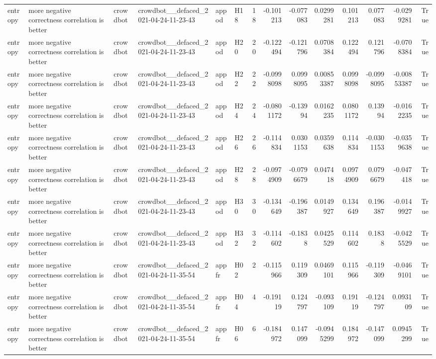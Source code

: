 \begin{longtable}{llllllrrrrrrrr}
entropy & more negative correctness correlation is better & crowdbot & crowdbot\_\_defaced\_2021-04-24-11-23-43 & appod & H18 & 18 & -0.101213 & -0.077083 & 0.0299281 & 0.101213 & 0.077083 & -0.0299281 & True \\
entropy & more negative correctness correlation is better & crowdbot & crowdbot\_\_defaced\_2021-04-24-11-23-43 & appod & H20 & 20 & -0.122494 & -0.121796 & 0.0708384 & 0.122494 & 0.121796 & -0.0708384 & True \\
entropy & more negative correctness correlation is better & crowdbot & crowdbot\_\_defaced\_2021-04-24-11-23-43 & appod & H22 & 22 & -0.0998098 & 0.0998095 & 0.00853387 & 0.0998098 & -0.0998095 & -0.00853387 & True \\
entropy & more negative correctness correlation is better & crowdbot & crowdbot\_\_defaced\_2021-04-24-11-23-43 & appod & H24 & 24 & -0.0801172 & -0.13994 & 0.0162235 & 0.0801172 & 0.13994 & -0.0162235 & True \\
entropy & more negative correctness correlation is better & crowdbot & crowdbot\_\_defaced\_2021-04-24-11-23-43 & appod & H26 & 26 & -0.114834 & 0.0301153 & 0.0359638 & 0.114834 & -0.0301153 & -0.0359638 & True \\
entropy & more negative correctness correlation is better & crowdbot & crowdbot\_\_defaced\_2021-04-24-11-23-43 & appod & H28 & 28 & -0.0974909 & -0.0796679 & 0.047418 & 0.0974909 & 0.0796679 & -0.047418 & True \\
entropy & more negative correctness correlation is better & crowdbot & crowdbot\_\_defaced\_2021-04-24-11-23-43 & appod & H30 & 30 & -0.134649 & -0.196387 & 0.0149927 & 0.134649 & 0.196387 & -0.0149927 & True \\
entropy & more negative correctness correlation is better & crowdbot & crowdbot\_\_defaced\_2021-04-24-11-23-43 & appod & H32 & 32 & -0.114602 & -0.1838 & 0.0425529 & 0.114602 & 0.1838 & -0.0425529 & True \\
entropy & more negative correctness correlation is better & crowdbot & crowdbot\_\_defaced\_2021-04-24-11-35-54 & appfr & H02 & 2 & -0.115966 & 0.119309 & 0.0469101 & 0.115966 & -0.119309 & -0.0469101 & True \\
entropy & more negative correctness correlation is better & crowdbot & crowdbot\_\_defaced\_2021-04-24-11-35-54 & appfr & H04 & 4 & -0.19119 & 0.124797 & -0.093109 & 0.19119 & -0.124797 & 0.093109 & True \\
entropy & more negative correctness correlation is better & crowdbot & crowdbot\_\_defaced\_2021-04-24-11-35-54 & appfr & H06 & 6 & -0.184972 & 0.147099 & -0.0945299 & 0.184972 & -0.147099 & 0.0945299 & True \\

\end{longtable}
